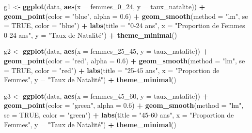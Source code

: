 \documentclass[
]{article}
\newenvironment{Shaded}{\begin{snugshade}}{\end{snugshade}}
\newcommand{\AttributeTok}[1]{\textcolor[rgb]{0.13,0.29,0.53}{#1}}
\newcommand{\ConstantTok}[1]{\textcolor[rgb]{0.56,0.35,0.01}{#1}}
\newcommand{\FloatTok}[1]{\textcolor[rgb]{0.00,0.00,0.81}{#1}}
\newcommand{\FunctionTok}[1]{\textcolor[rgb]{0.13,0.29,0.53}{\textbf{#1}}}
\newcommand{\NormalTok}[1]{#1}
\newcommand{\OtherTok}[1]{\textcolor[rgb]{0.56,0.35,0.01}{#1}}
\newcommand{\SpecialCharTok}[1]{\textcolor[rgb]{0.81,0.36,0.00}{\textbf{#1}}}
\newcommand{\StringTok}[1]{\textcolor[rgb]{0.31,0.60,0.02}{#1}}
\begin{document}
\begin{Shaded}
\begin{Highlighting}[]
\NormalTok{g1 }\OtherTok{\textless{}{-}} \FunctionTok{ggplot}\NormalTok{(data, }\FunctionTok{aes}\NormalTok{(}\AttributeTok{x =}\NormalTok{ femmes\_0\_24, }\AttributeTok{y =}\NormalTok{ taux\_natalite)) }\SpecialCharTok{+}
  \FunctionTok{geom\_point}\NormalTok{(}\AttributeTok{color =} \StringTok{"blue"}\NormalTok{, }\AttributeTok{alpha =} \FloatTok{0.6}\NormalTok{) }\SpecialCharTok{+}
  \FunctionTok{geom\_smooth}\NormalTok{(}\AttributeTok{method =} \StringTok{"lm"}\NormalTok{, }\AttributeTok{se =} \ConstantTok{TRUE}\NormalTok{, }\AttributeTok{color =} \StringTok{"blue"}\NormalTok{) }\SpecialCharTok{+}
  \FunctionTok{labs}\NormalTok{(}\AttributeTok{title =} \StringTok{"0{-}24 ans"}\NormalTok{,}
       \AttributeTok{x =} \StringTok{"Proportion de Femmes 0{-}24 ans"}\NormalTok{,}
       \AttributeTok{y =} \StringTok{"Taux de Natalité"}\NormalTok{) }\SpecialCharTok{+}
  \FunctionTok{theme\_minimal}\NormalTok{()}

\NormalTok{g2 }\OtherTok{\textless{}{-}} \FunctionTok{ggplot}\NormalTok{(data, }\FunctionTok{aes}\NormalTok{(}\AttributeTok{x =}\NormalTok{ femmes\_25\_45, }\AttributeTok{y =}\NormalTok{ taux\_natalite)) }\SpecialCharTok{+}
  \FunctionTok{geom\_point}\NormalTok{(}\AttributeTok{color =} \StringTok{"red"}\NormalTok{, }\AttributeTok{alpha =} \FloatTok{0.6}\NormalTok{) }\SpecialCharTok{+}
  \FunctionTok{geom\_smooth}\NormalTok{(}\AttributeTok{method =} \StringTok{"lm"}\NormalTok{, }\AttributeTok{se =} \ConstantTok{TRUE}\NormalTok{, }\AttributeTok{color =} \StringTok{"red"}\NormalTok{) }\SpecialCharTok{+}
  \FunctionTok{labs}\NormalTok{(}\AttributeTok{title =} \StringTok{"25{-}45 ans"}\NormalTok{,}
       \AttributeTok{x =} \StringTok{"Proportion de Femmes"}\NormalTok{,}
       \AttributeTok{y =} \StringTok{"Taux de Natalité"}\NormalTok{) }\SpecialCharTok{+}
  \FunctionTok{theme\_minimal}\NormalTok{()}

\NormalTok{g3 }\OtherTok{\textless{}{-}} \FunctionTok{ggplot}\NormalTok{(data, }\FunctionTok{aes}\NormalTok{(}\AttributeTok{x =}\NormalTok{ femmes\_45\_60, }\AttributeTok{y =}\NormalTok{ taux\_natalite)) }\SpecialCharTok{+}
  \FunctionTok{geom\_point}\NormalTok{(}\AttributeTok{color =} \StringTok{"green"}\NormalTok{, }\AttributeTok{alpha =} \FloatTok{0.6}\NormalTok{) }\SpecialCharTok{+}
  \FunctionTok{geom\_smooth}\NormalTok{(}\AttributeTok{method =} \StringTok{"lm"}\NormalTok{, }\AttributeTok{se =} \ConstantTok{TRUE}\NormalTok{, }\AttributeTok{color =} \StringTok{"green"}\NormalTok{) }\SpecialCharTok{+}
  \FunctionTok{labs}\NormalTok{(}\AttributeTok{title =} \StringTok{"45{-}60 ans"}\NormalTok{,}
       \AttributeTok{x =} \StringTok{"Proportion de Femmes"}\NormalTok{,}
       \AttributeTok{y =} \StringTok{"Taux de Natalité"}\NormalTok{) }\SpecialCharTok{+}
  \FunctionTok{theme\_minimal}\NormalTok{()}


\end{Highlighting}
\end{Shaded}
\end{document}
